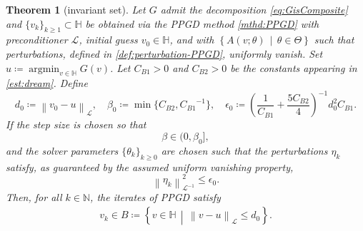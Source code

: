 \documentclass[10pt,a4paper]{amsart}
\newtheorem{thm}{Theorem}
\newcommand{\CddB}{{C_{B2}}} %
\newcommand{\CdvB}{{C_{B1}}} %
\newcommand{\HH}{\mathbb{H}}
\newcommand{\LL}{\mathcal{L}}
\newcommand{\LLinv}{{\mathcal{L}^{-1}}}
\DeclareMathOperator*{\argmin}{argmin}
\newcommand{\norm}[2]{\left\| #1 \right\| _{#2}}
\newcommand{\polN}{\mathbb N}
\newcommand{\s}{{\beta}}	%
\newcommand{\vk}{{v_{k}}}
\begin{document}
	\begin{thm}[invariant set]
	\label{thm:invariant-set}
Let $G$ admit the decomposition \eqref{eq:GisComposite} and $\{v_k\}_{k\ge1} \subset \HH$ be obtained via the PPGD method \eqref{mthd:PPGD} with preconditioner $\LL$, initial guess $v_0\in \HH$, and with $\left\{A(v;\theta) \, \middle| \, \theta\in \Theta \right\}$ such that perturbations, defined in \eqref{def:perturbation-PPGD}, uniformly vanish. Set $u \coloneqq \argmin_{v\in\HH}G(v)$. Let $\CdvB>0$ and $\CddB>0$ be the constants appearing in \eqref{est:dream}. Define
	\[
d_0 \coloneqq \norm{v_0 - u}{\LL}, \quad \s_0 \coloneqq  \min\{\CddB, \CdvB^{-1} \} , \quad \epsilon_0 \coloneqq \left(\frac{1}{\CdvB} +\frac{5\CddB}{4} \right)^{-1} d_0^2 \CdvB.
	\]
If the step size is chosen so that
	\begin{equation}
	\label{est:sz-cond-invariant-set}
\s \in (0, \s_0],
	\end{equation}
and the solver parameters $\{\theta_k\}_{k\ge0}$ are chosen such that the perturbations $\eta_{k}$ satisfy, as guaranteed by the assumed uniform vanishing property,
	\begin{equation}
	\label{est:pert-cond-invariant-set}
\norm{\eta_{k}}{\LLinv}^2 \le \epsilon_0.
	\end{equation}
Then, for all $k \in \polN$, the iterates of PPGD satisfy
	\begin{align}
	\label{obj:invariant-set}
\vk \in B \coloneqq \left\{ v\in\HH \, \middle| \, \norm{v-u}{\LL} \le d_0  \right\}.
	\end{align}
	\end{thm}
\end{document}
